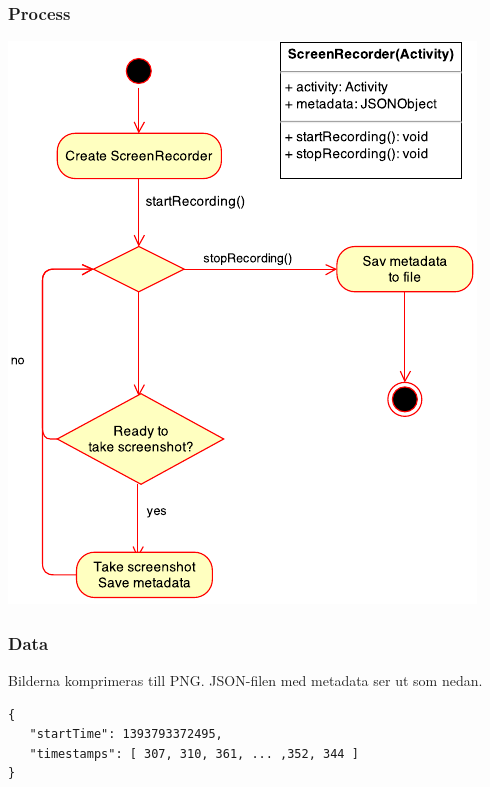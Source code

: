 \subsubsection{Process}
\includegraphics[scale=1.0]{screenflow.pdf}
\subsubsection{Data}
Bilderna komprimeras till PNG. JSON-filen med metadata ser ut som nedan.

\begin{verbatim}
{
   "startTime": 1393793372495,
   "timestamps": [ 307, 310, 361, ... ,352, 344 ]
}
\end{verbatim}